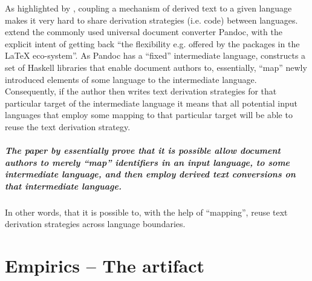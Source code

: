 \documentclass{scrreprt}
\begin{document}
As highlighted by \citet{krijnen}, coupling a mechanism of derived text to a given language makes it very hard to share derivation strategies (i.e. code) between languages.  \citet{krijnen} extend the commonly used universal document converter Pandoc\footnotePandoc, with the explicit intent of getting back ``the flexibility e.g. offered by the packages in the \LaTeX{} eco-system''. As Pandoc has a ``fixed'' intermediate language, \citet{krijnen} constructs a set of Haskell libraries that enable document authors to, essentially, ``map'' newly introduced elements of some language to the intermediate language. Consequently, if the author then writes text derivation strategies for that particular target of the intermediate language it means that all potential input languages that employ some mapping to that particular target will be able to reuse the text derivation strategy.

\paragraph{The paper by \citet{krijnen} essentially prove that it is possible allow document authors to merely ``map'' identifiers in an input language, to some intermediate language, and then employ derived text conversions on that intermediate language.} In other words, that it is possible to, with the help of ``mapping'', reuse text derivation strategies across language boundaries.

























%
%
%
%
%
%


\chapter{Empirics -- The artifact}



%
%
\end{document}
